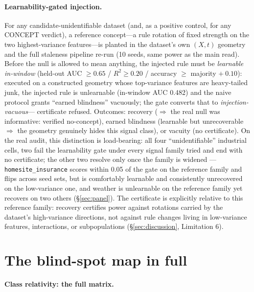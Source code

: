 \documentclass[10pt]{article} %
\begin{document}
\paragraph{Learnability-gated injection.} For any candidate-unidentifiable dataset (and, as a positive
control, for any CONCEPT verdict), a reference concept---a rule rotation of fixed strength on
the two highest-variance features---is planted in the dataset's own $(X, t)$ geometry and the full
staleness pipeline re-run (10 seeds, same power as the main read). Before the null is allowed to
mean anything, the injected rule must be \emph{learnable in-window} (held-out AUC $\ge 0.65$ / $R^2 \ge 0.20$
/ accuracy $\ge$ majority $+\ 0.10$): executed on a constructed geometry whose top-variance features
are heavy-tailed junk, the injected rule is unlearnable (in-window AUC 0.482) and the naive
protocol grants ``earned blindness'' vacuously; the gate converts that to \emph{injection-vacuous}---%
certificate refused. Outcomes: recovery ($\Rightarrow$ the real null was informative: verified no-concept),
earned blindness (learnable but unrecoverable $\Rightarrow$ the geometry genuinely hides this signal
class), or vacuity (no certificate). On the real audit, this distinction is load-bearing: all four
``unidentifiable'' industrial cells, two fail the learnability gate under every signal family
tried and end with no certificate; the other two resolve only once the family is widened
---\texttt{homesite\_insurance} scores within 0.05 of the gate on the reference family and flips
across seed sets, but is comfortably learnable and consistently unrecovered on the low-variance
one, and weather is unlearnable on the reference family yet recovers on two others
(\S\ref{sec:panel}). The certificate is explicitly
relative to this reference family: recovery certifies power against rotations carried by the
dataset's high-variance directions, not against rule changes living in low-variance features,
interactions, or subpopulations (\S\ref{sec:discussion}, Limitation 6).

\section{The blind-spot map in full}\label{app:properscore}

\paragraph{Class relativity: the full matrix.}
\end{document}
